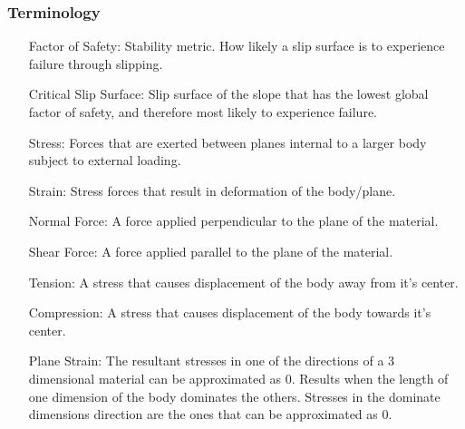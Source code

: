 \documentclass[12pt]{article}
\begin{document}
\subsubsection{Terminology}
\label{Sec:T}
\begin{itemize}
\item[Factor of Safety:]Stability metric. How likely a slip surface is to experience failure through slipping.
\item[Critical Slip Surface:]Slip surface of the slope that has the lowest global factor of safety, and therefore most likely to experience failure.
\item[Stress:]Forces that are exerted between planes internal to a larger body subject to external loading.
\item[Strain:]Stress forces that result in deformation of the body/plane.
\item[Normal Force:]A force applied perpendicular to the plane of the material.
\item[Shear Force:]A force applied parallel to the plane of the material.
\item[Tension:]A stress that causes displacement of the body away from it's center.
\item[Compression:]A stress that causes displacement of the body towards it's center.
\item[Plane Strain:]The resultant stresses in one of the directions of a 3 dimensional material can be approximated as 0. Results when the length of one dimension of the body dominates the others. Stresses in the dominate dimensions direction are the ones that can be approximated as 0.
\end{itemize}
\end{document}
